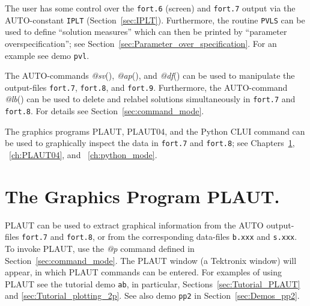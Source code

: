 \documentclass[12pt]{report}
\begin{document}
The user has some control over the {\tt fort.6} (screen) and {\tt fort.7} output 
via the {\cal AUTO}-constant {\tt IPLT} (Section~\ref{sec:IPLT}).
Furthermore, the routine {\tt PVLS} can be used to define ``solution measures''
which can then be printed by ``parameter overspecification'';
see Section~\ref{sec:Parameter_over_specification}.
For an example see demo {\tt pvl}.

The {\cal AUTO}-commands {\it @sv}(), {\it @ap}(),
 and {\it @df}() can be used 
to manipulate  the output-files {\tt fort.7}, {\tt fort.8},
and {\tt fort.9}.
Furthermore, the {\cal AUTO}-command {\it @lb}() can be
used to delete and
relabel solutions simultaneously in {\tt fort.7} and {\tt fort.8}.
For details see Section~\ref{sec:command_mode}.

The graphics programs {\cal PLAUT}, {\cal PLAUT04}, and the Python
CLUI command  can be used to graphically inspect 
the data in {\tt fort.7} and {\tt fort.8}; see Chapters~\ref{ch:PLAUT},
~\ref{ch:PLAUT04}, and ~\ref{ch:python_mode}.
 
\chapter{ The Graphics Program PLAUT.} \label{ch:PLAUT}
{\cal PLAUT} can be used to extract graphical
information from the {\cal AUTO} output-files {\tt fort.7} and {\tt fort.8},
or from the corresponding data-files {\tt b.xxx} and {\tt s.xxx}.
To invoke {\cal PLAUT}, use the {\it @p} command defined in 
Section~\ref{sec:command_mode}.
The {\cal PLAUT} window (a Tektronix window) will appear, in which {\cal PLAUT}
commands can be entered.
For examples of using {\cal PLAUT} see the tutorial demo {\tt ab}, in particular,
Sections~\ref{sec:Tutorial_PLAUT} and \ref{sec:Tutorial_plotting_2p}.
See also demo {\tt pp2} in Section~\ref{sec:Demos_pp2}.
\end{document}
